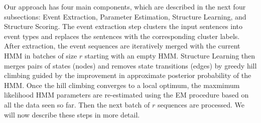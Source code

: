 \documentclass[letterpaper]{article}
\begin{document}






Our approach has four main components, which are described in the next four subsections: Event Extraction, Parameter Estimation, Structure Learning, and Structure Scoring. The event extraction step clusters the input sentences into event types and replaces the sentences with the corresponding cluster labels.  After extraction, the event sequences are iteratively merged with the current HMM in batches of size $r$ starting with an empty HMM. Structure Learning then merges pairs of states (nodes) and removes state transitions (edges) by greedy hill climbing guided by the improvement in approximate
posterior probability of the HMM.  Once the hill climbing converges to a local optimum, the maxmimum likelihood HMM parameters are re-estimated using the EM procedure based on all the data seen so far. Then the next batch of $r$ sequences are processed.  We will now describe these steps in more detail.
\end{document}
